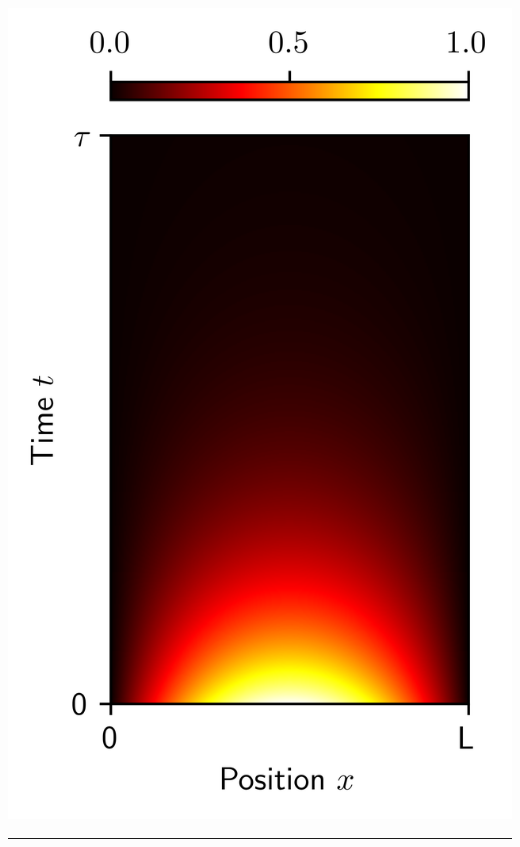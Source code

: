 \documentclass[aspectratio=169,compress,12pt,dvipsnames]{beamer}
\begin{document}
\begin{frame}
  \vfill
  \begin{minipage}{.28\textwidth}
    \centering
    \includegraphics[width=\textwidth]{true_solution.png}
  \end{minipage}%
  \hfill
  \begin{minipage}{.68\textwidth}
    \begin{center}
    \end{center}
    \par\bigskip
    \hrule
    \par\bigskip

\end{minipage}
\end{frame}
\end{document}
